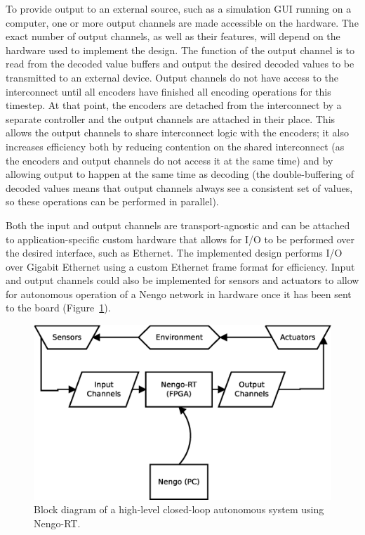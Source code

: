 \documentclass[english]{article}
\newcommand{\design}{Nengo-RT}
\begin{document}
To provide output to an external source, such as a simulation GUI running on a computer, one or more output channels
are made accessible on the hardware. The exact number of output channels, as well as their features, will depend on the hardware used to implement the design.
The function of the output channel is to read from the decoded value buffers and output the desired decoded values to be transmitted
to an external device. Output channels do not have access to the interconnect until all encoders have finished all
encoding operations for this timestep. At that point, the encoders are detached from the interconnect by a separate controller and the output
channels are attached in their place. This allows the output channels to share interconnect logic with the encoders;
it also increases efficiency both by reducing contention on the shared interconnect (as the encoders and output channels
do not access it at the same time) and by allowing output to happen at the same time as decoding
(the double-buffering of decoded values means that output channels always see a consistent set of values,
so these operations can be performed in parallel).

Both the input and output channels are transport-agnostic and can be attached to application-specific custom hardware that allows for
I/O to be performed over the desired interface, such as Ethernet. The implemented design performs I/O over Gigabit Ethernet using a custom Ethernet frame format for efficiency.
Input and output channels could also be implemented for sensors and actuators to allow for autonomous operation of a Nengo network in hardware once it has been sent to the board
(Figure~\ref{fig:closedloop}).

\begin{figure}
\centering

\includegraphics[width=5.0in]{robot-closed-loop.eps}

\caption{Block diagram of a high-level closed-loop autonomous system using \design{}.}
\label{fig:closedloop}
\end{figure}
\end{document}
